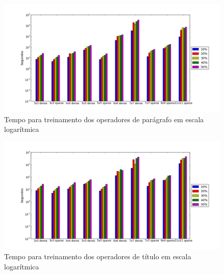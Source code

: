 \documentclass[a4paper,11pt]{article}
\begin{document}
  \begin{figure}[p]
    \centerline{\includegraphics[width=1.2\textwidth]{assets/experiment_charts/TextRegion_paragraph_time_log.png}}
    \caption{Tempo para treinamento dos operadores de parágrafo em escala logarítmica}
    \label{fig:paragraph_build_time_log}
  \end{figure}

  \begin{figure}[p]
    \centerline{\includegraphics[width=1.2\textwidth]{assets/experiment_charts/TextRegion_heading_time_log.png}}
    \caption{Tempo para treinamento dos operadores de título em escala logarítmica}
    \label{fig:heading_build_time_log}
  \end{figure}
\end{document}

